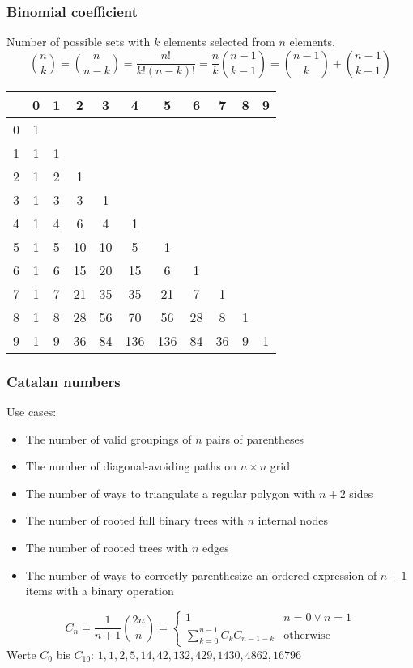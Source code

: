 \subsubsection{Binomial coefficient}
Number of possible sets with $k$ elements selected from $n$ elements. 
\begin{equation*}
  \binom{n}{k} = \binom{n}{n - k} = \frac{n!}{k!(n - k)!} =
  \frac{n}{k}\binom{n - 1}{k - 1} = \binom{n - 1}{k} + \binom{n - 1}{k
  - 1}
\end{equation*}
\begin{center}
	\begin{tabular}{ |l||c|c|c|c|c|c|c|c|c|c| } 
		\hline
		\diagbox{$n$}{$k$} & 0 & 1 & 2 & 3 & 4 & 5 & 6 & 7 & 8 & 9\\
		\hline\hline
		0 &  1 &   &    &    &     &     &    &    &  &  \\
		1 &  1 & 1 &    &    &     &     &    &    &  &  \\
		2 &  1 & 2 & 1  &    &     &     &    &    &  &  \\
		3 &  1 & 3 & 3  & 1  &     &     &    &    &  &  \\
		4 &  1 & 4 & 6  & 4  & 1   &     &    &    &  &  \\
		5 &  1 & 5 & 10 & 10 & 5   & 1   &    &    &  &  \\
		6 &  1 & 6 & 15 & 20 & 15  & 6   & 1  &    &  &  \\
		7 &  1 & 7 & 21 & 35 & 35  & 21  & 7  & 1  &  &  \\
		8 &  1 & 8 & 28 & 56 & 70  & 56  & 28 & 8  & 1&  \\
		9 &  1 & 9 & 36 & 84 & 136 & 136 & 84 & 36 & 9& 1\\
		\hline
	\end{tabular}
\end{center}
\subsubsection{Catalan numbers}
Use cases:
\begin{itemize}
\item The number of valid groupings of $n$ pairs of parentheses
\item The number of diagonal-avoiding paths on $n\times n$ grid
\item The number of ways to triangulate a regular polygon with $n + 2$
  sides
\item The number of rooted full binary trees with $n$ internal nodes
\item The number of rooted trees with $n$ edges
\item The number of ways to correctly parenthesize an ordered expression of $n
  + 1$ items with a binary operation
\end{itemize}
\begin{equation*}
  C_n = \frac{1}{n + 1}\binom{2n}{n} =
  \begin{cases}
    1 & n = 0 \lor n = 1\\
    \sum\limits_{k = 0}^{n - 1}C_kC_{n - 1 - k} & \text{otherwise}
  \end{cases}
\end{equation*}
Werte $C_0$ bis $C_{10}$: $1, 1, 2, 5, 14, 42, 132, 429, 1430, 4862, 16796$

